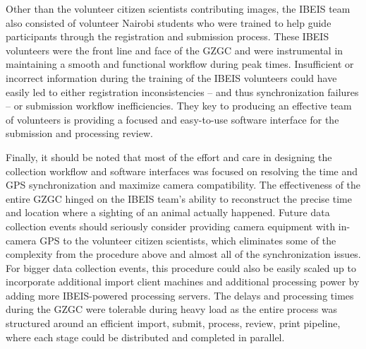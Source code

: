 Other than the volunteer citizen scientists contributing images, the IBEIS team also consisted of volunteer Nairobi students who were trained to help guide participants through the registration and submission process.  These IBEIS volunteers were the front line and face of the GZGC and were instrumental in maintaining a smooth and functional workflow during peak times.  Insufficient or incorrect information during the training of the IBEIS volunteers could have easily led to either registration inconsistencies -- and thus synchronization failures -- or submission workflow inefficiencies.  They key to producing an effective team of volunteers is providing a focused and easy-to-use software interface for the submission and processing review.

Finally, it should be noted that most of the effort and care in designing the collection workflow and software interfaces was focused on resolving the time and GPS synchronization and maximize camera compatibility.  The effectiveness of the entire GZGC hinged on the IBEIS team's ability to reconstruct the precise time and location where a sighting of an animal actually happened.  Future data collection events should seriously consider providing camera equipment with in-camera GPS to the volunteer citizen scientists, which eliminates some of the complexity from the procedure above and almost all of the synchronization issues.  For bigger data collection events, this procedure could also be easily scaled up to incorporate additional import client machines and additional processing power by adding more IBEIS-powered processing servers.  The delays and processing times during the GZGC were tolerable during heavy load as the entire process was structured around an efficient import, submit, process, review, print pipeline, where each stage could be distributed and completed in parallel.
